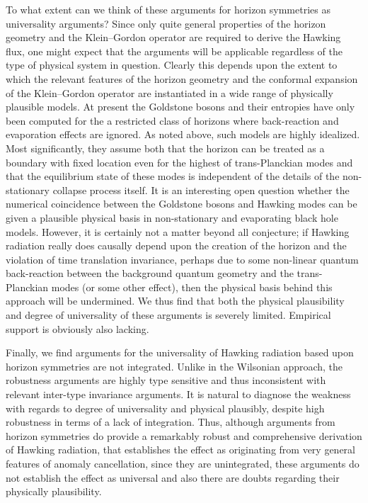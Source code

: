 \documentclass[12pt,english]{article}
\numberwithin{equation}{section}
\begin{document}
To what extent can we think of these arguments for horizon symmetries as universality arguments? Since only quite general properties of the horizon geometry and the Klein--Gordon operator are required to derive the Hawking flux, one might expect that the arguments will be applicable regardless of the type of physical system in question. Clearly this depends upon the extent to which the relevant features of the horizon geometry and the conformal expansion of the Klein--Gordon operator are instantiated in a wide range of physically plausible models. At present the Goldstone bosons and their entropies have only been computed for the a restricted class of horizons where back-reaction and evaporation effects are ignored. As noted above, such models are highly idealized. Most significantly, they assume both that the horizon can be treated as a boundary with fixed location even for the highest of trans-Planckian modes and that the equilibrium state of these modes is independent of the details of the non-stationary collapse process itself. It is an interesting open question whether the numerical coincidence between the Goldstone bosons and Hawking modes can be given a plausible physical basis in non-stationary and evaporating black hole models. However, it is certainly not a matter beyond all conjecture; if Hawking radiation really does causally depend upon the creation of the horizon and the violation of time translation invariance, perhaps due to some non-linear quantum back-reaction between the background quantum geometry and the trans-Planckian modes (or some other effect), then the physical basis behind this approach will be undermined. We thus find that both the physical plausibility and degree of universality of these arguments is severely limited. Empirical support is obviously also lacking.
 
Finally, we find arguments for the universality of Hawking radiation based upon horizon symmetries are not integrated. Unlike in the Wilsonian approach, the robustness arguments are highly type sensitive and thus inconsistent with relevant inter-type invariance arguments. It is natural to diagnose the weakness with regards to degree of universality and physical plausibly, despite high robustness in terms of a lack of integration. Thus, although arguments from horizon symmetries do provide a remarkably robust and comprehensive derivation of Hawking radiation, that establishes the effect as originating from very general features of anomaly cancellation, since they are unintegrated, these arguments do not establish the effect as universal and also there are doubts regarding their physically plausibility.  
\end{document}
